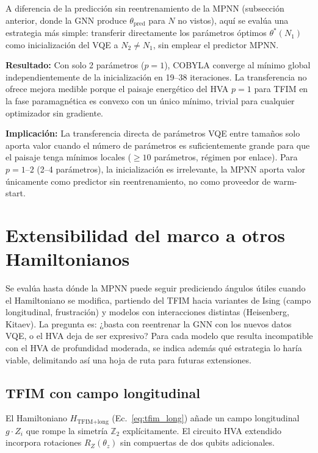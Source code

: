 \documentclass[11pt,a4paper,spanish]{book}
\begin{document}
A diferencia de la predicción sin reentrenamiento de la MPNN (subsección anterior, donde la GNN produce $\theta_{\text{pred}}$ para $N$ no vistos), aquí se evalúa una estrategia más simple: transferir directamente los parámetros óptimos $\theta^*(N_1)$ como inicialización del VQE a $N_2 \neq N_1$, sin emplear el predictor MPNN.

\textbf{Resultado:} Con solo 2 parámetros ($p = 1$), COBYLA \citep{singh2025} converge al mínimo global independientemente de la inicialización en 19--38 iteraciones. La transferencia no ofrece mejora medible porque el paisaje energético del HVA $p = 1$ para TFIM en la fase paramagnética es convexo con un único mínimo, trivial para cualquier optimizador sin gradiente.

\textbf{Implicación:} La transferencia directa de parámetros VQE entre tamaños solo aporta valor cuando el número de parámetros es suficientemente grande para que el paisaje tenga mínimos locales ($\geq 10$ parámetros, régimen por enlace). Para $p = 1$--$2$ (2--4 parámetros), la inicialización es irrelevante, la MPNN aporta valor únicamente como predictor sin reentrenamiento, no como proveedor de warm-start.


\section{Extensibilidad del marco a otros Hamiltonianos}
\label{sec:extensibilidad}

Se evalúa hasta dónde la MPNN puede seguir prediciendo ángulos útiles cuando el Hamiltoniano se modifica, partiendo del TFIM hacia variantes de Ising (campo longitudinal, frustración) y modelos con interacciones distintas (Heisenberg, Kitaev). La pregunta es: ¿basta con reentrenar la GNN con los nuevos datos VQE, o el HVA deja de ser expresivo? Para cada modelo que resulta incompatible con el HVA de profundidad moderada, se indica además qué estrategia lo haría viable, delimitando así una hoja de ruta para futuras extensiones.

\subsection{TFIM con campo longitudinal}

El Hamiltoniano $H_{\text{TFIM+long}}$ (Ec.~\ref{eq:tfim_long}) añade un campo longitudinal $g \cdot Z_i$ que rompe la simetría $\mathbb{Z}_2$ explícitamente. El circuito HVA extendido incorpora rotaciones $R_Z(\theta_z)$ sin compuertas de dos qubits adicionales.
\end{document}
